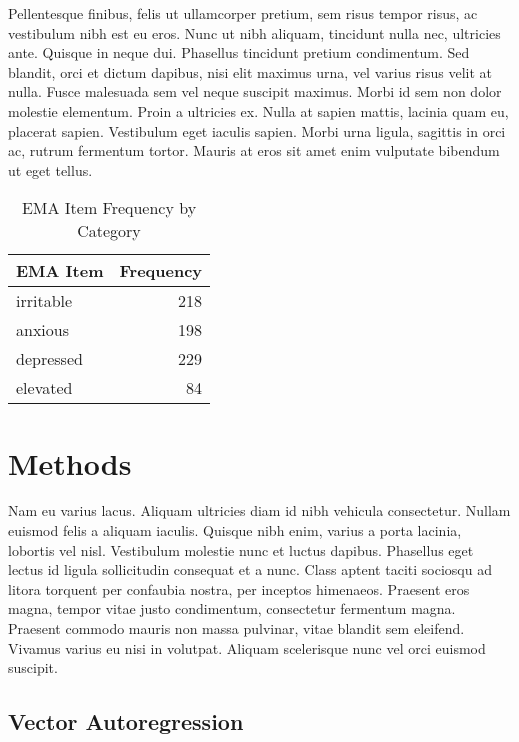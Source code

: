 \documentclass{article}
\begin{document}
Pellentesque finibus, felis ut ullamcorper pretium, sem risus tempor
risus, ac vestibulum nibh est eu eros. Nunc ut nibh aliquam, tincidunt
nulla nec, ultricies ante. Quisque in neque dui. Phasellus tincidunt
pretium condimentum. Sed blandit, orci et dictum dapibus, nisi elit
maximus urna, vel varius risus velit at nulla. Fusce malesuada sem vel
neque suscipit maximus. Morbi id sem non dolor molestie elementum. Proin
a ultricies ex. Nulla at sapien mattis, lacinia quam eu, placerat
sapien. Vestibulum eget iaculis sapien. Morbi urna ligula, sagittis in
orci ac, rutrum fermentum tortor. Mauris at eros sit amet enim vulputate
bibendum ut eget tellus.

\begin{table}[!ht]
\centering
\begin{tabular}{lr}
\toprule
    \textbf{EMA Item} & \textbf{Frequency} \\ \midrule 
    irritable & 218 \\
    anxious & 198 \\
    depressed & 229 \\
    elevated & 84 \\
  \bottomrule
  \end{tabular}
  \caption{EMA Item Frequency by Category}
  \label{EMA}
\end{table}



\hypertarget{methods}{%
\section{Methods}\label{methods}}

Nam eu varius lacus. Aliquam ultricies diam id nibh vehicula
consectetur. Nullam euismod felis a aliquam iaculis. Quisque nibh enim,
varius a porta lacinia, lobortis vel nisl. Vestibulum molestie nunc et
luctus dapibus. Phasellus eget lectus id ligula sollicitudin consequat
et a nunc. Class aptent taciti sociosqu ad litora torquent per confaubia
nostra, per inceptos himenaeos. Praesent eros magna, tempor vitae justo
condimentum, consectetur fermentum magna. Praesent commodo mauris non
massa pulvinar, vitae blandit sem eleifend. Vivamus varius eu nisi in
volutpat. Aliquam scelerisque nunc vel orci euismod suscipit.

\hypertarget{vector-autoregression}{%
\subsection{Vector Autoregression}\label{vector-autoregression}}
\end{document}
